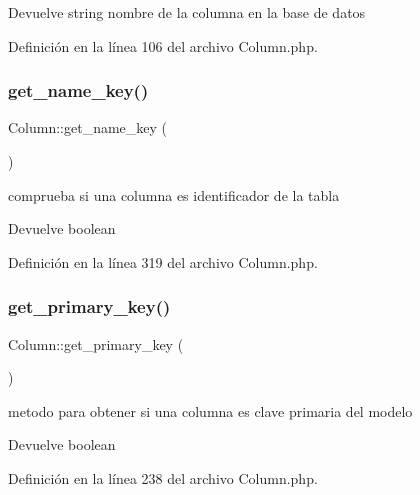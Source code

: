 \begin{DoxyReturn}{Devuelve}
string nombre de la columna en la base de datos 
\end{DoxyReturn}


Definición en la línea 106 del archivo Column.\+php.

\mbox{\label{class_column_afbe92323031606a80891038f2a833e37}} 
\subsubsection{\texorpdfstring{get\_name\_key()}{get\_name\_key()}}
{\footnotesize\ttfamily Column\+::get\+\_\+name\+\_\+key (\begin{DoxyParamCaption}{ }\end{DoxyParamCaption})}

comprueba si una columna es identificador de la tabla

\begin{DoxyReturn}{Devuelve}
boolean 
\end{DoxyReturn}


Definición en la línea 319 del archivo Column.\+php.

\mbox{\label{class_column_a596352fac897c8f8a877a67ab390df76}} 
\subsubsection{\texorpdfstring{get\_primary\_key()}{get\_primary\_key()}}
{\footnotesize\ttfamily Column\+::get\+\_\+primary\+\_\+key (\begin{DoxyParamCaption}{ }\end{DoxyParamCaption})}

metodo para obtener si una columna es clave primaria del modelo

\begin{DoxyReturn}{Devuelve}
boolean 
\end{DoxyReturn}


Definición en la línea 238 del archivo Column.\+php.

\mbox{\label{class_column_a9322fc30623d22ff4023413a43250689}} 
